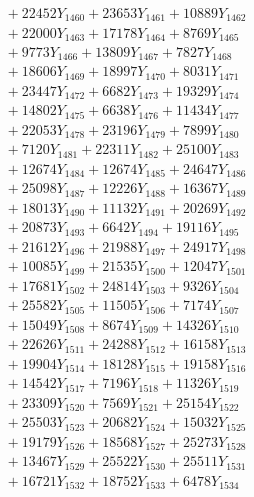 \documentclass[a4paper,10pt]{article}
\begin{document}
{\begin{align}
&\;  + 22452 Y_{1460} + 23653 Y_{1461} + 10889 Y_{1462} \\[0.3ex]
&\;  + 22000 Y_{1463} + 17178 Y_{1464} + 8769 Y_{1465} \\[0.3ex]
&\;  + 9773 Y_{1466} + 13809 Y_{1467} + 7827 Y_{1468} \\[0.5ex]\allowbreak
&\;  + 18606 Y_{1469} + 18997 Y_{1470} + 8031 Y_{1471} \\[0.3ex]
&\;  + 23447 Y_{1472} + 6682 Y_{1473} + 19329 Y_{1474} \\[0.3ex]
&\;  + 14802 Y_{1475} + 6638 Y_{1476} + 11434 Y_{1477} \\[0.3ex]
&\;  + 22053 Y_{1478} + 23196 Y_{1479} + 7899 Y_{1480} \\[0.3ex]
&\;  + 7120 Y_{1481} + 22311 Y_{1482} + 25100 Y_{1483} \\[0.3ex]
&\;  + 12674 Y_{1484} + 12674 Y_{1485} + 24647 Y_{1486} \\[0.3ex]
&\;  + 25098 Y_{1487} + 12226 Y_{1488} + 16367 Y_{1489} \\[0.3ex]
&\;  + 18013 Y_{1490} + 11132 Y_{1491} + 20269 Y_{1492} \\[0.3ex]
&\;  + 20873 Y_{1493} + 6642 Y_{1494} + 19116 Y_{1495} \\[0.3ex]
&\;  + 21612 Y_{1496} + 21988 Y_{1497} + 24917 Y_{1498} \\[0.5ex]\allowbreak
&\;  + 10085 Y_{1499} + 21535 Y_{1500} + 12047 Y_{1501} \\[0.3ex]
&\;  + 17681 Y_{1502} + 24814 Y_{1503} + 9326 Y_{1504} \\[0.3ex]
&\;  + 25582 Y_{1505} + 11505 Y_{1506} + 7174 Y_{1507} \\[0.3ex]
&\;  + 15049 Y_{1508} + 8674 Y_{1509} + 14326 Y_{1510} \\[0.3ex]
&\;  + 22626 Y_{1511} + 24288 Y_{1512} + 16158 Y_{1513} \\[0.3ex]
&\;  + 19904 Y_{1514} + 18128 Y_{1515} + 19158 Y_{1516} \\[0.3ex]
&\;  + 14542 Y_{1517} + 7196 Y_{1518} + 11326 Y_{1519} \\[0.3ex]
&\;  + 23309 Y_{1520} + 7569 Y_{1521} + 25154 Y_{1522} \\[0.3ex]
&\;  + 25503 Y_{1523} + 20682 Y_{1524} + 15032 Y_{1525} \\[0.3ex]
&\;  + 19179 Y_{1526} + 18568 Y_{1527} + 25273 Y_{1528} \\[0.5ex]\allowbreak
&\;  + 13467 Y_{1529} + 25522 Y_{1530} + 25511 Y_{1531} \\[0.3ex]
&\;  + 16721 Y_{1532} + 18752 Y_{1533} + 6478 Y_{1534} \\[0.3ex]

\end{align}}
\end{document}
